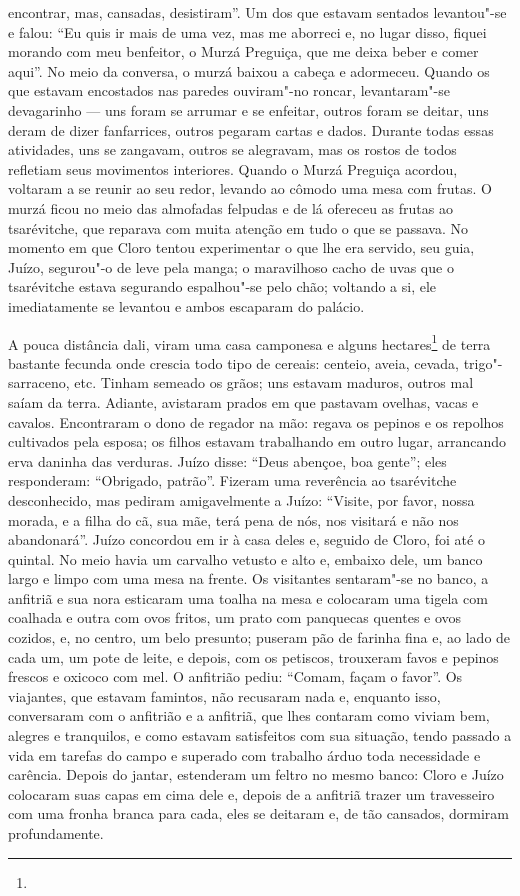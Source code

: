 encontrar, mas, cansadas, desistiram''. Um dos que estavam sentados
levantou"-se e falou: ``Eu quis ir mais de uma vez, mas me aborreci e, no
lugar disso, fiquei morando com meu benfeitor, o Murzá Preguiça, que me
deixa beber e comer aqui''. No meio da conversa, o murzá baixou a cabeça
e adormeceu. Quando os que estavam encostados nas paredes ouviram"-no
roncar, levantaram"-se devagarinho --- uns foram se arrumar e se
enfeitar, outros foram se deitar, uns deram de dizer fanfarrices,
outros pegaram cartas e dados. Durante todas essas atividades, uns se
zangavam, outros se alegravam, mas os rostos de todos refletiam seus
movimentos interiores. Quando o Murzá Preguiça acordou, voltaram a se
reunir ao seu redor, levando ao cômodo uma mesa com frutas. O murzá
ficou no meio das almofadas felpudas e de lá ofereceu as frutas ao
tsarévitche, que reparava com muita atenção em tudo o que se passava.
No momento em que Cloro tentou experimentar o que lhe era servido, seu guia, Juízo,
segurou"-o de leve pela manga; o maravilhoso cacho de uvas que o
tsarévitche estava segurando espalhou"-se pelo chão; voltando a si, ele
imediatamente se levantou e ambos escaparam do palácio.

A pouca distância dali, viram uma casa camponesa e alguns
hectares\footnote{} de terra
bastante fecunda onde crescia todo tipo de cereais: centeio, aveia,
cevada, trigo"-sarraceno, etc. Tinham semeado os grãos; uns estavam
maduros, outros mal saíam da terra. Adiante, avistaram prados em que
pastavam ovelhas, vacas e cavalos. Encontraram o dono de regador na mão:
regava os pepinos e os repolhos cultivados pela esposa; os filhos
estavam trabalhando em outro lugar, arrancando erva daninha das
verduras. Juízo disse: ``Deus abençoe, boa gente''; eles responderam:
``Obrigado, patrão''. Fizeram uma reverência ao tsarévitche
desconhecido, mas pediram amigavelmente a Juízo: ``Visite, por favor,
nossa morada, e a filha do cã, sua mãe, terá pena de nós, nos visitará e
não nos abandonará''. Juízo concordou em ir à casa deles e, seguido de
Cloro, foi até o quintal. No meio havia um carvalho vetusto e alto e,
embaixo dele, um banco largo e limpo com uma mesa na frente. Os
visitantes sentaram"-se no banco, a anfitriã e sua nora esticaram uma
toalha na mesa e colocaram uma tigela com coalhada e outra com ovos
fritos, um prato com panquecas quentes e ovos cozidos, e, no centro, um
belo presunto; puseram pão de farinha fina e, ao lado de cada um, um
pote de leite, e depois, com os petiscos, trouxeram favos e pepinos
frescos e oxicoco com mel. O anfitrião pediu: ``Comam, façam o favor''.
Os viajantes, que estavam famintos, não recusaram nada e, enquanto isso,
conversaram com o anfitrião e a anfitriã, que lhes contaram como viviam
bem, alegres e tranquilos, e como estavam satisfeitos com sua situação,
tendo passado a vida em tarefas do campo e superado com trabalho árduo
toda necessidade e carência. Depois do jantar, estenderam um feltro no
mesmo banco: Cloro e Juízo colocaram suas capas em cima dele e, depois de a anfitriã
trazer um travesseiro com uma fronha branca para cada, eles se deitaram
e, de tão cansados, dormiram profundamente.

